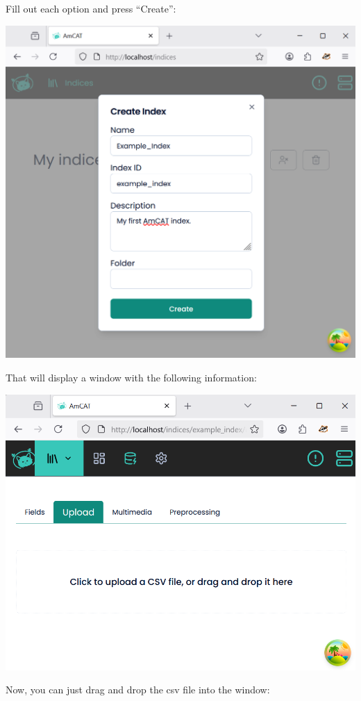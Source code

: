 \documentclass[
  letterpaper,
  DIV=11,
  numbers=noendperiod]{scrreprt}
\begin{document}
Fill out each option and press ``Create'':

\includegraphics{media/amcat-3.1-4.png}

That will display a window with the following information:

\includegraphics{media/amcat-3.1-5.png}

Now, you can just drag and drop the csv file into the window:
\end{document}
